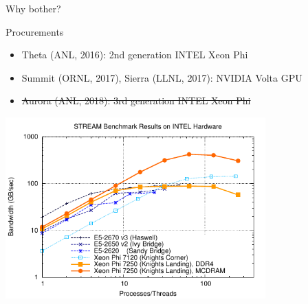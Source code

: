 \begin{frame}{Why bother?}
  \begin{block}{Procurements}
  \begin{itemize}
   \item Theta (ANL, 2016): 2nd generation INTEL Xeon Phi
   \item Summit (ORNL, 2017), Sierra (LLNL, 2017): NVIDIA Volta GPU
   \item \sout{Aurora (ANL, 2018): 3rd generation INTEL Xeon Phi}
  \end{itemize}
  \end{block}
  
  \begin{center} \vspace*{-0.5cm}
   \includegraphics[width=0.75\textwidth]{figures/stream.pdf}
  \end{center}

\end{frame}


